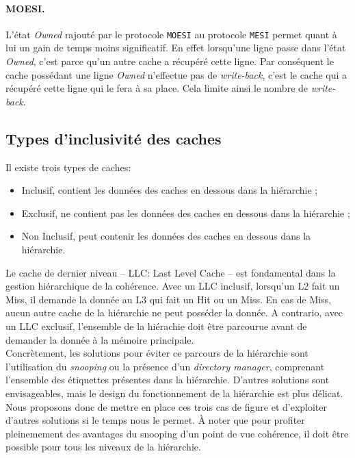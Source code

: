 \paragraph{MOESI.} L'état \emph{Owned} rajouté par le protocole \texttt{MOESI} au protocole \texttt{MESI} permet quant à lui un gain de temps moins significatif. En effet lorsqu'une ligne passe dans l'état \emph{Owned}, c'est parce qu'un autre cache a récupéré cette ligne. Par conséquent le cache possédant une ligne \emph{Owned} n'effectue pas de \emph{write-back}, c'est le cache qui a récupéré cette ligne qui le fera à sa place. Cela limite ainsi le nombre de \emph{write-back}.

\subsection{Types d'inclusivité des caches}
\label{global}

Il existe trois types de caches:
\begin{itemize}
\item Inclusif, contient les données des caches en dessous dans la hiérarchie ;
\item Exclusif, ne contient pas les données des caches en dessous dans la hiérarchie ;
\item Non Inclusif, peut contenir les données des caches en dessous dans la hiérarchie.\\
\end{itemize}

Le cache de dernier niveau -- LLC: Last Level Cache -- est fondamental dans la gestion hiérarchique de la cohérence. Avec un LLC inclusif, lorsqu'un L2 fait un Miss, il demande la donnée au L3 qui fait un Hit ou un Miss. En cas de Miss, aucun autre cache de la hiérarchie ne peut posséder la donnée. A contrario, avec un LLC exclusif, l'ensemble de la hiérachie doit être parcourue avant de demander la donnée à la mémoire principale. \\

Concrètement, les solutions pour éviter ce parcours de la hiérarchie sont l'utilisation du \emph{snooping} ou la présence d'un \emph{directory manager}, comprenant l'ensemble des étiquettes présentes dans la hiérarchie. D'autres solutions sont envisageables, mais le design du fonctionnement de la hiérarchie est plus délicat. Nous proposons donc de mettre en place ces trois cas de figure et d'exploiter d'autres solutions si le temps nous le permet. \`A noter que pour profiter pleinemement des avantages du snooping d'un point de vue cohérence, il doit être possible pour tous les niveaux de la hiérarchie.
